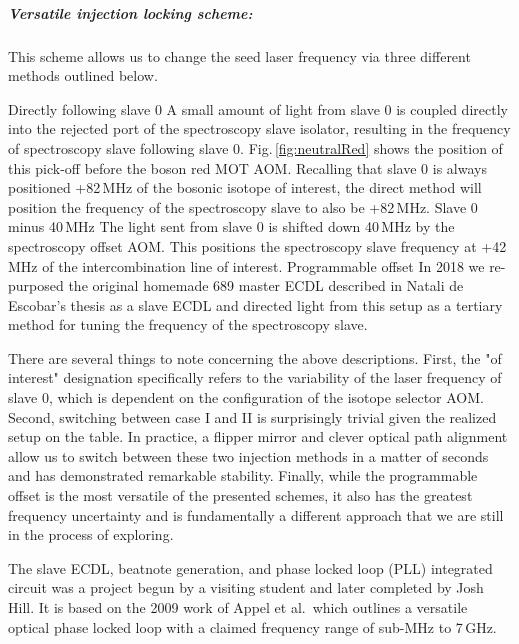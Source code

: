 \subparagraph{Versatile injection locking scheme:}
This scheme allows us to change the seed laser frequency via three different methods outlined below.
\begin{outline}[enumerate]
	\1 Directly following slave 0
		\2 A small amount of light from slave 0 is coupled directly into the rejected port of the spectroscopy slave isolator, resulting in the frequency of spectroscopy slave following slave 0. 
		Fig.\,\ref{fig:neutralRed} shows the position of this pick-off before the boson red MOT AOM. 
		Recalling that slave 0 is always positioned +82\,MHz of the bosonic isotope of interest, the direct method will position the frequency of the spectroscopy slave to also be +82\,MHz.
	\1 Slave 0 minus 40\,MHz
		\2 The light sent from slave 0 is shifted down 40\,MHz by the spectroscopy offset AOM. This positions the spectroscopy slave frequency at +42\,MHz of the intercombination line of interest.
	\1 Programmable offset
		\2 In 2018 we re-purposed the original homemade 689 master ECDL described in Natali de Escobar's thesis as a slave ECDL and directed light from this setup as a tertiary method for tuning the frequency of the spectroscopy slave. 
\end{outline}
There are several things to note concerning the above descriptions.
First, the "of interest" designation specifically refers to the variability of the laser frequency of slave 0, which is dependent on the configuration of the isotope selector AOM. 
Second, switching between case I and II is surprisingly trivial given the realized setup on the table.
In practice, a flipper mirror and clever optical path alignment allow us to switch between these two injection methods in a matter of seconds and has demonstrated remarkable stability.
Finally, while the programmable offset is the most versatile of the presented schemes, it also has the greatest frequency uncertainty and is fundamentally a different approach that we are still in the process of exploring.

The slave ECDL, beatnote generation, and phase locked loop (PLL) integrated circuit was a project begun by a visiting student and later completed by Josh Hill.
It is based on the 2009 work of Appel et al.\,\cite{Appel2009} which outlines a versatile optical phase locked loop with a claimed frequency range of sub-MHz to 7\,GHz.

